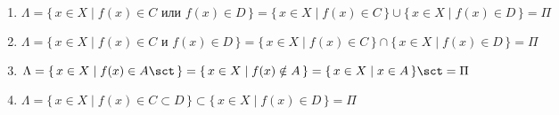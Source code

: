 \begin{enumerate}
	
	\item $\Lambda = \{\,x \in X \mid f(x) \in C \text{ или } f(x) \in D \,\} = \{\,x \in X \mid f(x) \in C\,\} \cup \{\,x \in X \mid f(x) \in D\,\} = \Pi$
	
	\item $\Lambda = \{\,x \in X \mid f(x) \in C \text{ и } f(x) \in D \,\} = \{\,x \in X \mid f(x) \in C\,\} \cap \{\,x \in X \mid f(x) \in D\,\} = \Pi$
	
	\item $\Lambda = \{\,x \in X \mid f(x) \in A\sct \,\} = \{\,x \in X \mid f(x) \notin A \,\} = \{\,x \in X \mid x \in A \,\}\sct = \Pi$
	
		\item $\Lambda = \{\,x \in X \mid f(x) \in C \subset D\,\} \subset \{\,x \in X \mid f(x) \in D\,\} = \Pi$
\end{enumerate}
